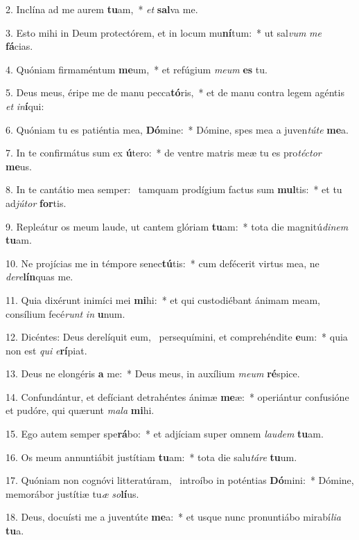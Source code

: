 2. Inclína ad me aurem \textbf{tu}am,~*  \textit{et} \textbf{sal}va me.\

3. Esto mihi in Deum protectórem, et in locum mu\textbf{ní}tum:~*  ut sal\textit{vum} \textit{me} \textbf{fá}cias.\

4. Quóniam firmaméntum \textbf{me}um,~*  et refúgium \textit{me}\textit{um} \textbf{es} tu.\

5. Deus meus, éripe me de manu pecca\textbf{tó}ris,~*  et de manu contra legem agéntis \textit{et} \textit{in}\textbf{í}qui:\

6. Quóniam tu es patiéntia mea, \textbf{Dó}mine:~*  Dómine, spes mea a juven\textit{tú}\textit{te} \textbf{me}a.\

7. In te confirmátus sum ex \textbf{ú}tero:~*  de ventre matris meæ tu es pro\textit{téc}\textit{tor} \textbf{me}us.\

8. In te cantátio mea semper: \dag\  tamquam prodígium factus sum \textbf{mul}tis:~*  et tu ad\textit{jú}\textit{tor} \textbf{for}tis.\

9. Repleátur os meum laude, ut cantem glóriam \textbf{tu}am:~*  tota die magnitú\textit{di}\textit{nem} \textbf{tu}am.\

10. Ne projícias me in témpore senec\textbf{tú}tis:~*  cum defécerit virtus mea, ne \textit{de}\textit{re}\textbf{lín}quas me.\

11. Quia dixérunt inimíci mei \textbf{mi}hi:~*  et qui custodiébant ánimam meam, consílium fecé\textit{runt} \textit{in} \textbf{u}num.\

12. Dicéntes: Deus derelíquit eum, \dag\  persequímini, et comprehéndite \textbf{e}um:~*  quia non est \textit{qui} \textit{e}\textbf{rí}piat.\

13. Deus ne elongéris \textbf{a} me:~*  Deus meus, in auxílium \textit{me}\textit{um} \textbf{ré}spice.\

14. Confundántur, et defíciant detrahéntes ánimæ \textbf{me}æ:~*  operiántur confusióne et pudóre, qui quærunt \textit{ma}\textit{la} \textbf{mi}hi.\

15. Ego autem semper spe\textbf{rá}bo:~*  et adjíciam super omnem \textit{lau}\textit{dem} \textbf{tu}am.\

16. Os meum annuntiábit justítiam \textbf{tu}am:~*  tota die salu\textit{tá}\textit{re} \textbf{tu}um.\

17. Quóniam non cognóvi litteratúram, \dag\  introíbo in poténtias \textbf{Dó}mini:~*  Dómine, memorábor justítiæ tu\textit{æ} \textit{so}\textbf{lí}us.\

18. Deus, docuísti me a juventúte \textbf{me}a:~*  et usque nunc pronuntiábo mirabí\textit{li}\textit{a} \textbf{tu}a.\

